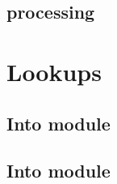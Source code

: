 \subsection{ processing}    \label{rlp utils: instructions: byte string processing}  

\section{Lookups}                            \label{rlp utils: lookups}
\subsection{Into \wcpMod{} module}           \label{rlp utils: lookups: rlp utils into wcp}           
\subsection{Into \shfMod{} module}           \label{rlp utils: lookups: rlp utils into shf}           
